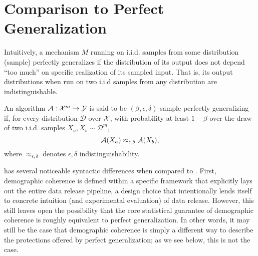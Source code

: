 \section{Comparison to Perfect Generalization}

 Intuitively, a mechanism $M$ running on i.i.d. samples from some distribution (sample) perfectly generalizes if the distribution of its output does not depend ``too much'' on specific realization of its sampled input. That is, its output distributions when run on two i.i.d samples from any distribution are indistinguishable.

\begin{definition}\label{def:sample-perfect-generalization}
An algorithm $\mathcal{A} : \mathcal{X}^m \to \mathcal{Y}$ is said to be $(\beta, \epsilon, \delta)$-sample perfectly generalizing if, for every distribution $\mathcal{D}$ over $\mathcal{X}$, with probability at least $1 - \beta$ over the draw of two i.i.d. samples $X_a, X_b \sim \mathcal{D}^m$,
\[
\mathcal{A}(X_a) \approx_{\epsilon, \delta} \mathcal{A}(X_b),
\]
where $\approx_{\epsilon, \delta}$ denotes $\epsilon,\delta$ indistinguishability.
\end{definition}

 has several noticeable syntactic differences when compared to . First, demographic coherence is defined within a specific framework that explicitly lays out the entire data release pipeline, a design choice that intentionally lends itself to concrete intuition (and experimental evaluation) of data release. However, this still leaves open the possibility that the core statistical guarantee of demographic coherence is roughly equivalent to perfect generalization. In other words, it may still be the case that demographic coherence is simply a different way to describe the protections offered by perfect generalization; as we see below, this is not the case.


